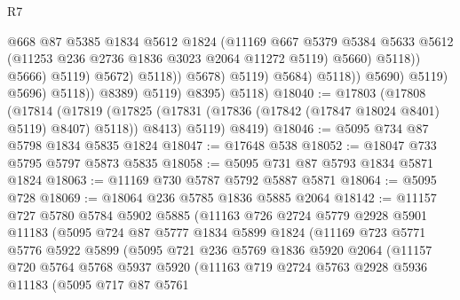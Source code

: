 \begin{lexlean}{R7}
\begin{coremodule}
                                              @668
                                              @87
                                              @5385
                                              @1834
                                              @5612
                                              @1824
                                              (@11169
                                                @667
                                                @5379
                                                @5384
                                                @5633
                                                @5612
                                                (@11253 @236 @2736 @1836 @3023 @2064 @11272 @5119)
                                                @5660)
                                              @5118))
                                          @5666)
                                        @5119)
                                      @5672)
                                    @5118))
                                @5678)
                              @5119)
                            @5684)
                          @5118))
                      @5690)
                    @5119)
                  @5696)
                @5118))
            @8389)
          @5119)
        @8395)
      @5118)
@18040 := @17803
    (@17808
      (@17814
        (@17819 (@17825 (@17831 (@17836 (@17842 (@17847 @18024 @8401) @5119) @8407) @5118)) @8413)
        @5119)
      @8419)
@18046 := @5095 @734 @87 @5798 @1834 @5835 @1824
@18047 := @17648 @538
@18052 := @18047 @733 @5795 @5797 @5873 @5835
@18058 := @5095 @731 @87 @5793 @1834 @5871 @1824
@18063 := @11169 @730 @5787 @5792 @5887 @5871
@18064 := @5095 @728
@18069 := @18064 @236 @5785 @1836 @5885 @2064
@18142 := @11157
    @727
    @5780
    @5784
    @5902
    @5885
    (@11163
      @726
      @2724
      @5779
      @2928
      @5901
      @11183
      (@5095
        @724
        @87
        @5777
        @1834
        @5899
        @1824
        (@11169
          @723
          @5771
          @5776
          @5922
          @5899
          (@5095
            @721
            @236
            @5769
            @1836
            @5920
            @2064
            (@11157
              @720
              @5764
              @5768
              @5937
              @5920
              (@11163
                @719
                @2724
                @5763
                @2928
                @5936
                @11183
                (@5095
                  @717
                  @87
                  @5761

\end{coremodule}
\end{lexlean}
